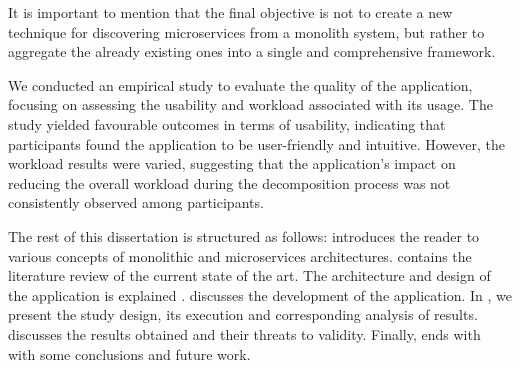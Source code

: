 It is important to mention that the final objective is not to create a new
technique for discovering microservices from a monolith system, but rather to
aggregate the already existing ones into a single and comprehensive framework.

We conducted an empirical study to evaluate the quality of the application,
focusing on assessing the usability and workload associated with its usage. The
study yielded favourable outcomes in terms of usability, indicating that
participants found the application to be user-friendly and intuitive. However,
the workload results were varied, suggesting that the application's impact on
reducing the overall workload during the decomposition process was not
consistently observed among participants.

The rest of this dissertation is structured as follows: 
introduces the reader to various concepts of monolithic and microservices
architectures.  contains the literature review of the current
state of the art. The architecture and design of the application is explained
.  discusses the
development of the application. In , we present
the study design, its execution and corresponding analysis of results.
 discusses the results obtained and their threats to
validity. Finally,  ends with with some conclusions and
future work.
